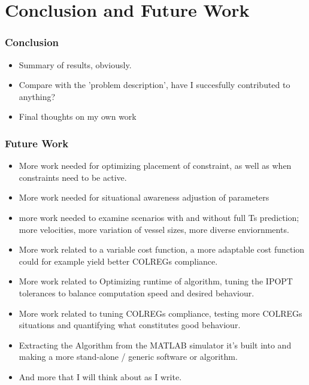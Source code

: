 \section{Conclusion and Future Work}

\subsubsection*{Conclusion}
\begin{itemize}
    \item Summary of results, obviously.
    \item Compare with the 'problem description', have I succesfully contributed to anything?
    \item Final thoughts on my own work
\end{itemize}

\subsubsection*{Future Work}
\begin{itemize}
    \item More work needed for optimizing placement of constraint, as well as when constraints need to be active.
    \item More work needed for situational awareness adjustion of parameters
    \item more work needed to examine scenarios with and without full \gls{Ts} prediction;
    more velocities, more variation of vessel sizes, more diverse enviornments.
    \item More work related to a variable cost function, a more adaptable cost function could for example yield better COLREGs compliance.
    \item More work related to Optimizing runtime of algorithm, tuning the IPOPT tolerances to balance computation speed and desired behaviour.
    \item More work related to tuning COLREGs compliance, testing more COLREGs situations and quantifying what constitutes good behaviour.
    \item Extracting the Algorithm from the MATLAB simulator it's built into and making a more stand-alone / generic software or algorithm.
    \item And more that I will think about as I write.
\end{itemize}

\newpage